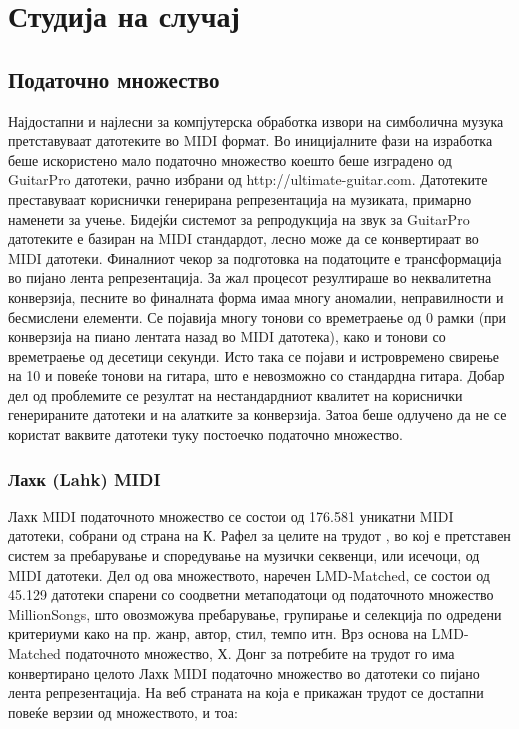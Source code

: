\chapter{Студија на случај}
\label{ch:studija}

\section{Податочно множество}

Најдостапни и најлесни за компјутерска обработка извори на симболична музука претставуваат датотеките во MIDI формат. Во иницијалните фази на изработка беше искористено мало податочно множество коешто беше изградено од GuitarPro датотеки, рачно избрани од http://ultimate-guitar.com. Датотеките преставуваат кориснички генерирана репрезентација на музиката, примарно наменети за учење. Бидејќи системот за репродукција на звук за GuitarPro датотеките е базиран на MIDI стандардот, лесно може да се конвертираат во MIDI датотеки. Финалниот чекор за подготовка на податоците е трансформација во пијано лента репрезентација. За жал процесот резултираше во неквалитетна конверзија, песните во финалната форма имаа многу аномалии, неправилности и бесмислени елементи. Се појавија многу тонови со времетраење од 0 рамки (при конверзија на пиано лентата назад во MIDI датотека), како и тонови со времетраење од десетици секунди. Исто така се појави и истровремено свирење на 10 и повеќе тонови на гитара, што е невозможно со стандардна гитара. Добар дел од проблемите се резултат на нестандардниот квалитет на кориснички генерираните датотеки и на алатките за конверзија. Затоа беше одлучено да не се користат ваквите датотеки туку постоечко податочно множество.

\subsection{Лахк (Lahk) MIDI}

Лахк MIDI податочното множество се состои од 176.581 уникатни MIDI датотеки, собрани од страна на К. Рафел за целите на трудот \cite{Raffel2016}, во кој е претставен систем за пребарување и споредување на музички секвенци, или исечоци, од MIDI датотеки. Дел од ова множеството, наречен LMD-Matched, се состои од 45.129 датотеки спарени со соодветни метаподатоци од податочното множество MillionSongs, што овозможува пребарување, групирање и селекција по одредени критериуми како на пр. жанр, автор, стил, темпо итн. 
Врз основа на LMD-Matched податочното множество, Х. Донг за потребите на трудот \cite{Dong2017} го има конвертирано целото Лахк MIDI податочно множество во датотеки со пијано лента репрезентација. На веб страната на која е прикажан трудот се достапни повеќе верзии од множеството, и тоа:

